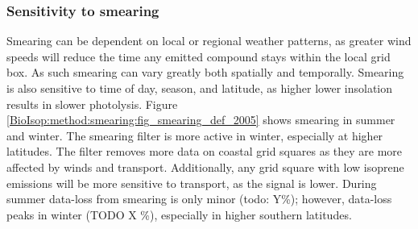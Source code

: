       
    
    \subsubsection{Sensitivity to smearing}
    
      Smearing can be dependent on local or regional weather patterns, as greater wind speeds will reduce the time any emitted compound stays within the local grid box.
      As such smearing can vary greatly both spatially and temporally.
      Smearing is also sensitive to time of day, season, and latitude, as higher lower insolation results in slower photolysis.
      Figure \ref{BioIsop:method:smearing:fig_smearing_def_2005} shows smearing in summer and winter.
      The smearing filter is more active in winter, especially at higher latitudes.
      The filter removes more data on coastal grid squares as they are more affected by winds and transport.
      Additionally, any grid square with low isoprene emissions will be more sensitive to transport, as the signal is lower.
      During summer data-loss from smearing is only minor (todo: Y\%); however, data-loss peaks in winter (TODO X \%), especially in higher southern latitudes.
      
      
      
